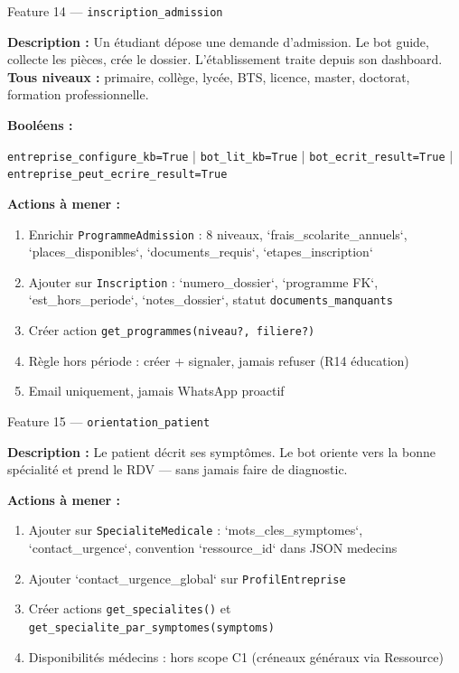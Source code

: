 \documentclass[11pt,a4paper]{article}
\newcommand{\slug}[1]{\texttt{\color{AGTDark}#1}}
\begin{document}
\begin{featurebox}{Feature 14 — \slug{inscription\_admission}}

\textbf{Description :} Un étudiant dépose une demande d'admission. Le bot guide,
collecte les pièces, crée le dossier. L'établissement traite depuis son dashboard.
\textbf{Tous niveaux :} primaire, collège, lycée, BTS, licence, master, doctorat,
formation professionnelle.

\textbf{Booléens :}
\begin{decisionbox}
\texttt{entreprise\_configure\_kb=True} | \texttt{bot\_lit\_kb=True} |
\texttt{bot\_ecrit\_result=True} | \texttt{entreprise\_peut\_ecrire\_result=True}
\end{decisionbox}

\textbf{Actions à mener :}
\begin{enumerate}
  \item Enrichir \slug{ProgrammeAdmission} : 8 niveaux, `frais\_scolarite\_annuels`,
        `places\_disponibles`, `documents\_requis`, `etapes\_inscription`
  \item Ajouter sur \slug{Inscription} : `numero\_dossier`, `programme FK`,
        `est\_hors\_periode`, `notes\_dossier`, statut \texttt{documents\_manquants}
  \item Créer action \slug{get\_programmes(niveau?, filiere?)}
  \item Règle hors période : créer + signaler, jamais refuser (R14 éducation)
  \item Email uniquement, jamais WhatsApp proactif
\end{enumerate}

\end{featurebox}

\bigskip

\begin{featurebox}{Feature 15 — \slug{orientation\_patient}}

\textbf{Description :} Le patient décrit ses symptômes. Le bot oriente vers la
bonne spécialité et prend le RDV — sans jamais faire de diagnostic.

\textbf{Actions à mener :}
\begin{enumerate}
  \item Ajouter sur \slug{SpecialiteMedicale} : `mots\_cles\_symptomes`,
        `contact\_urgence`, convention `ressource\_id` dans JSON medecins
  \item Ajouter `contact\_urgence\_global` sur \slug{ProfilEntreprise}
  \item Créer actions \slug{get\_specialites()} et \slug{get\_specialite\_par\_symptomes(symptoms)}
  \item Disponibilités médecins : hors scope C1 (créneaux généraux via Ressource)
\end{enumerate}

\end{featurebox}
\end{document}
